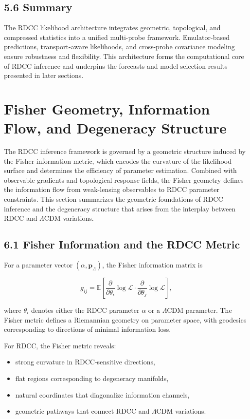 \documentclass[11pt,a4paper]{article}
\begin{document}
\subsection*{5.6 Summary}

The RDCC likelihood architecture integrates geometric, topological, and 
compressed statistics into a unified multi-probe framework. Emulator-based 
predictions, transport-aware likelihoods, and cross-probe covariance modeling 
ensure robustness and flexibility. This architecture forms the computational 
core of RDCC inference and underpins the forecasts and model-selection results 
presented in later sections.
\section{Fisher Geometry, Information Flow, and Degeneracy Structure}

The RDCC inference framework is governed by a geometric structure induced by the 
Fisher information metric, which encodes the curvature of the likelihood surface 
and determines the efficiency of parameter estimation. Combined with observable 
gradients and topological response fields, the Fisher geometry defines the 
information flow from weak-lensing observables to RDCC parameter constraints. 
This section summarizes the geometric foundations of RDCC inference and the 
degeneracy structure that arises from the interplay between RDCC and 
$\Lambda$CDM variations.

\subsection*{6.1 Fisher Information and the RDCC Metric}

For a parameter vector $(\alpha, \mathbf{p}_{\Lambda})$, the Fisher information 
matrix is


\[
    g_{ij}
    =
    \mathbb{E}
    \left[
        \frac{\partial}{\partial \theta_{i}}
        \log \mathcal{L}
        \cdot
        \frac{\partial}{\partial \theta_{j}}
        \log \mathcal{L}
    \right],
\]


where $\theta_{i}$ denotes either the RDCC parameter $\alpha$ or a 
$\Lambda$CDM parameter. The Fisher metric defines a Riemannian geometry on 
parameter space, with geodesics corresponding to directions of minimal 
information loss.

For RDCC, the Fisher metric reveals:

\begin{itemize}
    \item strong curvature in RDCC-sensitive directions,
    \item flat regions corresponding to degeneracy manifolds,
    \item natural coordinates that diagonalize information channels,
    \item geometric pathways that connect RDCC and $\Lambda$CDM variations.
\end{itemize}
\end{document}
